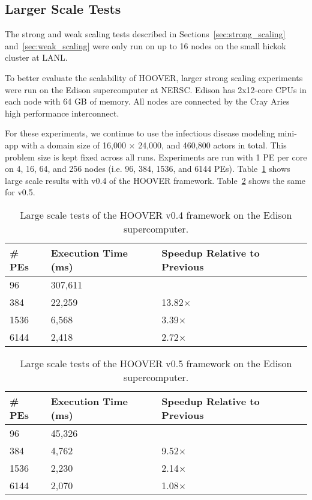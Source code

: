 \subsection{Larger Scale Tests}

The strong and weak scaling tests described in Sections~\ref{sec:strong_scaling}
and~\ref{sec:weak_scaling} were only run on up to 16 nodes on the small hickok
cluster at LANL.

To better evaluate the scalability of HOOVER, larger strong scaling experiments
were run on the Edison supercomputer at NERSC. Edison has 2x12-core CPUs in each
node with 64 GB of memory. All nodes are connected by the Cray Aries
high performance interconnect.

For these experiments, we continue to use the infectious disease modeling
mini-app with a domain size of 16,000 $\times$ 24,000, and 460,800 actors in
total. This problem size is kept fixed across all runs. Experiments are run with
1 PE per core on 4, 16, 64, and 256 nodes (i.e. 96, 384, 1536, and 6144 PEs).
Table~\ref{tab:large_scale1} shows large scale results with v0.4 of the HOOVER
framework. Table~\ref{tab:large_scale2} shows the same for v0.5.

\begin{table}
\centering
\begin{tabularx}{\textwidth}{ | X || X | X |}
\hline
    \textbf{\# PEs}             & \textbf{Execution Time (ms)} & \textbf{Speedup Relative to Previous} \\\hline
    96                          & 307,611 &               \\\hline
    384                         & 22,259  & 13.82$\times$ \\\hline
    1536                        & 6,568   & 3.39$\times$  \\\hline
    6144                        & 2,418   & 2.72$\times$  \\\hline
\end{tabularx}
\caption{Large scale tests of the HOOVER v0.4 framework on the Edison supercomputer.}
\label{tab:large_scale1}
\end{table}

\begin{table}
\centering
\begin{tabularx}{\textwidth}{ | X || X | X |}
\hline
    \textbf{\# PEs}             & \textbf{Execution Time (ms)} & \textbf{Speedup Relative to Previous} \\\hline
    96                          & 45,326 &              \\\hline
    384                         & 4,762  & 9.52$\times$ \\\hline
    1536                        & 2,230  & 2.14$\times$ \\\hline
    6144                        & 2,070  & 1.08$\times$ \\\hline
\end{tabularx}
\caption{Large scale tests of the HOOVER v0.5 framework on the Edison supercomputer.}
\label{tab:large_scale2}
\end{table}

